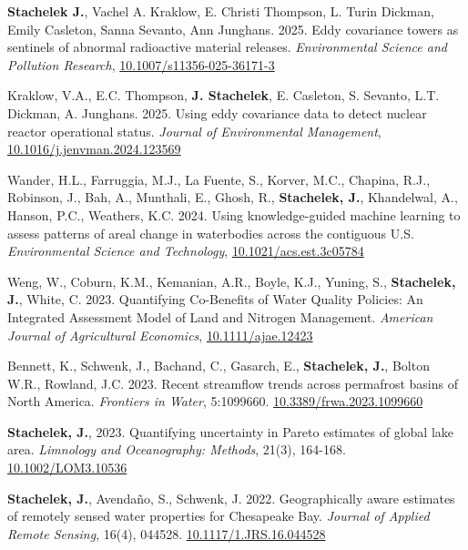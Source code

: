 
\item \textbf{Stachelek J.}, Vachel A. Kraklow, E. Christi Thompson, L. Turin Dickman, Emily Casleton, Sanna Sevanto, Ann Junghans. 2025. Eddy covariance towers as sentinels of abnormal radioactive material releases. \emph{Environmental Science and Pollution Research}, \href{https://doi.org/10.1007/s11356-025-36171-3}{10.1007/s11356-025-36171-3}

\item Kraklow, V.A., E.C. Thompson, \textbf{J. Stachelek}, E. Casleton, S. Sevanto, L.T. Dickman, A. Junghans. 2025. Using eddy covariance data to detect nuclear reactor operational status. \emph{Journal of Environmental Management}, \href{https://doi.org/10.1016/j.jenvman.2024.123569}{10.1016/j.jenvman.2024.123569}

\item Wander, H.L., Farruggia, M.J., La Fuente, S., Korver, M.C., Chapina, R.J., Robinson, J., Bah, A., Munthali, E., Ghosh, R., \textbf{Stachelek, J.}, Khandelwal, A., Hanson, P.C., Weathers, K.C. 2024. Using knowledge-guided machine learning to assess patterns of areal change in waterbodies across the contiguous U.S. \emph{Environmental Science and Technology}, \href{https://doi.org/10.1021/acs.est.3c05784}{10.1021/acs.est.3c05784}

\item Weng, W., Coburn, K.M., Kemanian, A.R., Boyle, K.J., Yuning, S., \textbf{Stachelek, J.}, White, C. 2023. Quantifying Co-Benefits of Water Quality Policies: An Integrated Assessment Model of Land and Nitrogen Management. \emph{American Journal of Agricultural Economics}, \href{https://doi.org/10.1111/ajae.12423}{10.1111/ajae.12423}

\item Bennett, K., Schwenk, J., Bachand, C., Gasarch, E., \textbf{Stachelek, J.}, Bolton W.R., Rowland, J.C. 2023. Recent streamflow trends across permafrost basins of North America. \emph{Frontiers in Water}, 5:1099660. \href{https://doi.org/10.3389/frwa.2023.1099660}{10.3389/frwa.2023.1099660}

\item \textbf{Stachelek, J.}, 2023. Quantifying uncertainty in Pareto estimates of global lake area. \emph{Limnology and Oceanography: Methods}, 21(3), 164-168. \href{https://doi.org/10.1002/LOM3.10536}{10.1002/LOM3.10536}

\item \textbf{Stachelek, J.}, Avendaño, S., Schwenk, J. 2022. Geographically aware estimates of remotely sensed water properties for Chesapeake Bay. \emph{Journal of Applied Remote Sensing}, 16(4), 044528. \href{https://doi.org/10.1117/1.JRS.16.044528}{10.1117/1.JRS.16.044528}

